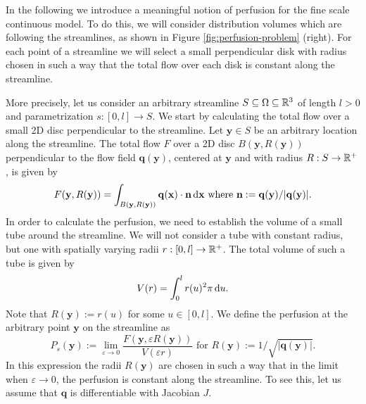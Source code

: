 \documentclass[aps,prb,article,groupedaddress,showkeys]{revtex4}
\begin{document}
	In the following we introduce a meaningful notion of perfusion for the fine scale continuous model.
	To do this, we will consider distribution volumes which are following the streamlines, as shown in Figure \ref{fig:perfusion-problem} (right). 	
	For each point of a streamline we will select a small perpendicular disk with radius chosen in such a way that the total flow over each disk is constant along the streamline.

	More precisely, let us consider an arbitrary streamline $S \subseteq \Omega \subseteq \mathbb{R}^3$ of length $l>0$ and parametrization $s:[0,l] \to S$.
	We start by calculating the total flow over a small 2D disc perpendicular to the streamline.
	Let $\mathbf{y} \in S$ be an arbitrary location along the streamline. 
	The total flow $F$ over a 2D disc $B(\mathbf{y},R(\mathbf{y}))$ perpendicular to the flow field $\mathbf{q}(\mathbf{y})$, centered at $\mathbf{y}$ and with radius $R:S\to\mathbb{R}^+$, is given by
	\begin{equation}
		F(\mathbf{y},R(\mathbf{y})) = \int_{B(\mathbf{y},R(\mathbf{y}))} \mathbf{q}(\mathbf{x}) \cdot \mathbf{n} \,\mathrm{d} \mathbf{x} \text{ where }\mathbf{n} := \mathbf{q}(\mathbf{y})/\vert \mathbf{q}(\mathbf{y}) \vert.
		\label{eq:Fdisc}
	\end{equation}
	In order to calculate the perfusion, we need to establish the volume of a small tube around the streamline.
	We will not consider a tube with constant radius, but one with spatially varying radii $r:[0,l] \to \mathbb{R}^+$.
	The total volume of such a tube is given by
	\begin{equation}
		V(r) = \int_0^l r(u)^2 \pi \,\mathrm{d} u.
	\end{equation}
        Note that $R(\mathbf{y}):=r(u)$ for some $u \in [0,l]$.
        We define the perfusion at the arbitrary point $\mathbf{y}$ on the streamline as
	\begin{equation}
		P_s(\mathbf{y}):=  \lim_{\varepsilon \to 0} \frac{F(\mathbf{y},\varepsilon R(\mathbf{y}))}{V(\varepsilon r)} \text{ for } R(\mathbf{y}):=1/\sqrt{\vert \mathbf{q}(\mathbf{y}) \vert}.
		\label{eq:perfusiondef}
	\end{equation}
	In this expression the radii $R(\mathbf{y})$ are chosen in such a way that in the limit when $\varepsilon \to 0$, the perfusion is constant along the streamline. 
	To see this, let us assume that $\mathbf{q}$ is differentiable with Jacobian $J$.
\end{document}
